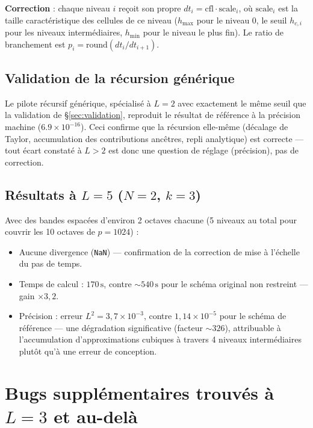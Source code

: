 \documentclass[11pt]{article}
\newcommand{\code}[1]{\texttt{#1}}
\begin{document}
\textbf{Correction} : chaque niveau $i$ reçoit son propre $dt_i =
\mathrm{cfl} \cdot \mathrm{scale}_i$, où $\mathrm{scale}_i$ est la taille
caractéristique des cellules de ce niveau ($h_{\max}$ pour le niveau 0,
le seuil $h_{c,i}$ pour les niveaux intermédiaires, $h_{\min}$ pour le
niveau le plus fin). Le ratio de branchement est $p_i = \mathrm{round}
(dt_i / dt_{i+1})$.

\subsection{Validation de la récursion générique}

Le pilote récursif générique, spécialisé à $L=2$ avec exactement le même
seuil que la validation de \S\ref{sec:validation}, reproduit le résultat
de référence à la précision machine ($6.9\times 10^{-16}$). Ceci confirme
que la récursion elle-même (décalage de Taylor, accumulation des
contributions ancêtres, repli analytique) est correcte --- tout écart
constaté à $L>2$ est donc une question de réglage (précision), pas de
correction.

\subsection{Résultats à $L=5$ ($N=2$, $k=3$)}

Avec des bandes espacées d'environ 2 octaves chacune (5 niveaux au total
pour couvrir les 10 octaves de $p=1024$) :
\begin{itemize}
  \item Aucune divergence (\code{NaN}) --- confirmation de la correction
  de mise à l'échelle du pas de temps.
  \item Temps de calcul : $170\,\mathrm{s}$, contre $\sim 540\,\mathrm{s}$
  pour le schéma original non restreint --- gain $\times 3{,}2$.
  \item Précision : erreur $L^2 = 3{,}7\times 10^{-3}$, contre
  $1{,}14\times 10^{-5}$ pour le schéma de référence --- une dégradation
  significative (facteur $\sim 326$), attribuable à l'accumulation
  d'approximations cubiques à travers 4 niveaux intermédiaires plutôt qu'à
  une erreur de conception.
\end{itemize}

\section{Bugs supplémentaires trouvés à $L=3$ et au-delà}
\label{sec:l3bugs}
\end{document}
